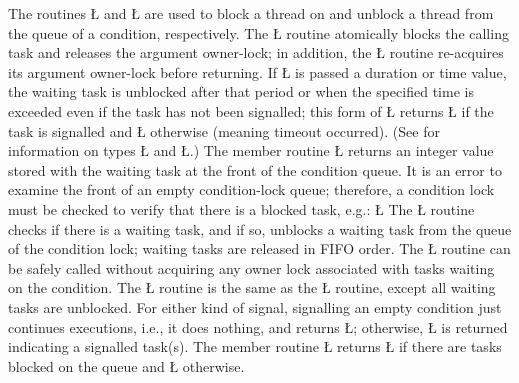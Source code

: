 \documentclass[openright,twoside]{report}
\begin{document}
The routines \LGinlinetrue\LGbegin\lgrinde\L{}\endlgrinde\LGend{} and \LGinlinetrue\LGbegin\lgrinde\L{}\endlgrinde\LGend{} are used to block a thread on and unblock a thread from the queue of a condition, respectively.
The \LGinlinetrue\LGbegin\lgrinde\L{}\endlgrinde\LGend{} routine atomically blocks the calling task and releases the argument owner-lock;
in addition, the \LGinlinetrue\LGbegin\lgrinde\L{}\endlgrinde\LGend{} routine re-acquires its argument owner-lock before returning.
If \LGinlinetrue\LGbegin\lgrinde\L{}\endlgrinde\LGend{} is passed a duration or time value, the waiting task is unblocked after that period or when the specified time is exceeded even if the task has not been signalled;
this form of \LGinlinetrue\LGbegin\lgrinde\L{}\endlgrinde\LGend{} returns \LGinlinetrue\LGbegin\lgrinde\L{}\endlgrinde\LGend{} if the task is signalled and \LGinlinetrue\LGbegin\lgrinde\L{}\endlgrinde\LGend{} otherwise (meaning timeout occurred).
(See  for information on types \LGinlinetrue\LGbegin\lgrinde\L{}\endlgrinde\LGend{} and \LGinlinetrue\LGbegin\lgrinde\L{}\endlgrinde\LGend{}.)
The member routine \LGinlinetrue\LGbegin\lgrinde\L{}\endlgrinde\LGend{} returns an integer value stored with the waiting task at the front of the condition queue.
It is an error to examine the front of an empty condition-lock queue;
therefore, a condition lock must be checked to verify that there is a blocked task, e.g.:
\LGinlinefalse\LGbegin\lgrinde
\L{}
\endlgrinde\LGend
The \LGinlinetrue\LGbegin\lgrinde\L{}\endlgrinde\LGend{} routine checks if there is a waiting task, and if so, unblocks a waiting task from the queue of the condition lock;
waiting tasks are released in FIFO order.
The \LGinlinetrue\LGbegin\lgrinde\L{}\endlgrinde\LGend{} routine can be safely called without acquiring any owner lock associated with tasks waiting on the condition.
The \LGinlinetrue\LGbegin\lgrinde\L{}\endlgrinde\LGend{} routine is the same as the \LGinlinetrue\LGbegin\lgrinde\L{}\endlgrinde\LGend{} routine, except all waiting tasks are unblocked.
For either kind of signal, signalling an empty condition just continues executions, i.e., it does nothing, and returns \LGinlinetrue\LGbegin\lgrinde\L{}\endlgrinde\LGend{};
otherwise, \LGinlinetrue\LGbegin\lgrinde\L{}\endlgrinde\LGend{} is returned indicating a signalled task(s).
The member routine \LGinlinetrue\LGbegin\lgrinde\L{}\endlgrinde\LGend{} returns \LGinlinetrue\LGbegin\lgrinde\L{}\endlgrinde\LGend{} if there are tasks blocked on the queue and \LGinlinetrue\LGbegin\lgrinde\L{}\endlgrinde\LGend{} otherwise.
\end{document}

